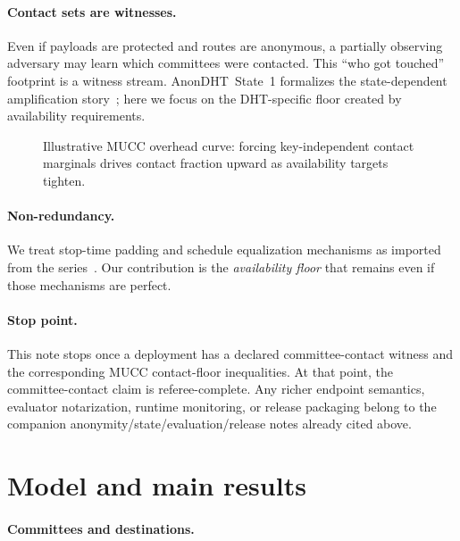 \documentclass[11pt]{article}
\begin{document}
\paragraph{Contact sets are witnesses.}
Even if payloads are protected and routes are anonymous, a partially observing adversary may learn which committees were contacted.
This ``who got touched'' footprint is a witness stream.
AnonDHT~State~1 formalizes the state-dependent amplification story~\cite{series:state1}; here we focus on the DHT-specific floor created by availability requirements.

\begin{figure}[t]
  \centering
  \caption{Illustrative MUCC overhead curve: forcing key-independent contact marginals drives contact fraction upward as availability targets tighten.}
  \label{fig:mucc-overhead}
\end{figure}

\paragraph{Non-redundancy.}
We treat stop-time padding and schedule equalization mechanisms as imported from the series~\cite{series:stoptimeaddendum,series:schedcompiler}.
Our contribution is the \emph{availability floor} that remains even if those mechanisms are perfect.

\paragraph{Stop point.}
This note stops once a deployment has a declared committee-contact witness and the corresponding MUCC contact-floor inequalities. At that point, the committee-contact claim is referee-complete. Any richer endpoint semantics, evaluator notarization, runtime monitoring, or release packaging belong to the companion anonymity/state/evaluation/release notes already cited above.\cite{series:oddsinflation,series:profiling,series:state3,series:evalnotary,series:release}


\section{Model and main results}
\label{sec:model}

\paragraph{Committees and destinations.}
\end{document}
